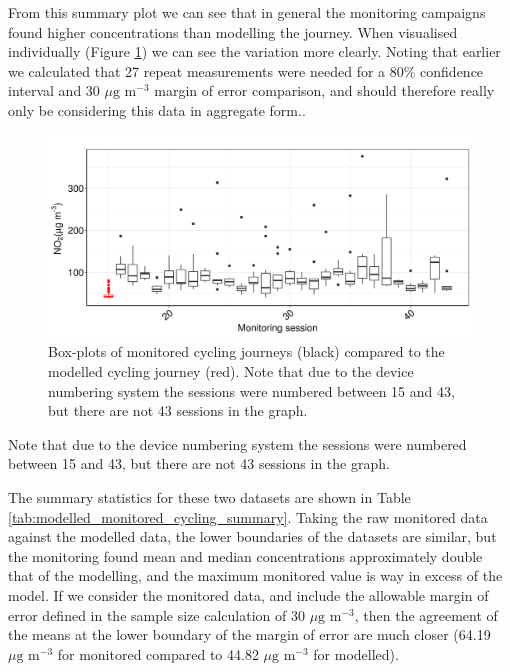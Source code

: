 From this summary plot we can see that in general the monitoring campaigns found higher concentrations than modelling the journey. When visualised individually (Figure \ref{fig:journey_boxplots}) we can see the variation more clearly. Noting that earlier we calculated that 27 repeat measurements were needed for a 80\% confidence interval and 30 $\mu \text{g m}^{-3}$ margin of error comparison, and should therefore really only be considering this data in aggregate form..

\begin{figure}[H]
\centering
\includegraphics[scale=0.5]{images/journey_boxplots.png}
\caption{Box-plots of monitored cycling journeys (black) compared to the modelled cycling journey (red). Note that due to the device numbering system the sessions were numbered between 15 and 43, but there are not 43 sessions in the graph.}
\label{fig:journey_boxplots}
\end{figure}

Note that due to the device numbering system the sessions were numbered between 15 and 43, but there are not 43 sessions in the graph.

The summary statistics for these two datasets are shown in Table \ref{tab:modelled_monitored_cycling_summary}. Taking the raw monitored data against the modelled data, the lower boundaries of the datasets are similar, but the monitoring found mean and median concentrations approximately double that of the modelling, and the maximum monitored value is way in excess of the model. If we consider the monitored data, and include the allowable margin of error defined in the sample size calculation of 30 $\mu \text{g m}^{-3}$, then the agreement of the means at the lower boundary of the margin of error are much closer (64.19 $\mu \text{g m}^{-3}$ for monitored compared to 44.82 $\mu \text{g m}^{-3}$ for modelled). 


